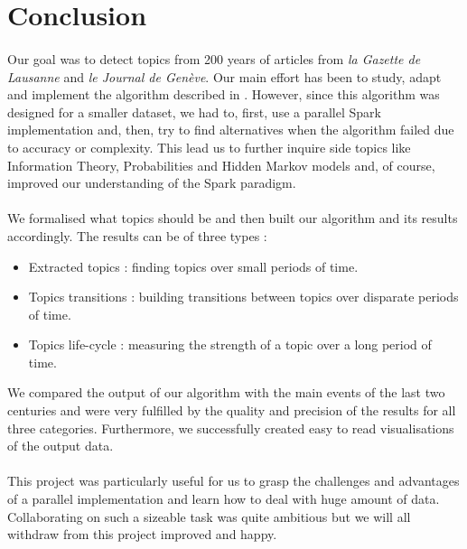 \section{Conclusion}

\paragraph{}
Our goal was to detect topics from 200 years of articles from \emph{la Gazette de Lausanne} and \emph{le Journal de Genève}. Our main effort has been to study, adapt and implement the algorithm described in \cite{kdd05-ttm}. However, since this algorithm was designed for a smaller dataset, we had to, first, use a parallel Spark implementation and, then, try to find alternatives when the algorithm failed due to accuracy or complexity. This lead us to further inquire side topics like Information Theory, Probabilities and Hidden Markov models and, of course, improved our understanding of the Spark paradigm.

\paragraph{}
We formalised what topics should be and then built our algorithm and its results accordingly. The results can be of three types : 
\begin{itemize}
\item Extracted topics : finding topics over small periods of time.
\item Topics transitions : building transitions between topics over disparate periods of time.
\item Topics life-cycle : measuring the strength of a topic over a long period of time.
\end{itemize}
We compared the output of our algorithm with the main events of the last two centuries and were very fulfilled by the quality and precision of the results for all three categories. Furthermore, we successfully created easy to read visualisations of the output data.

\paragraph{}
This project was particularly useful for us to grasp the challenges and advantages of a parallel implementation and learn how to deal with huge amount of data. Collaborating on such a sizeable task was quite ambitious but we will all withdraw from this project improved and happy.